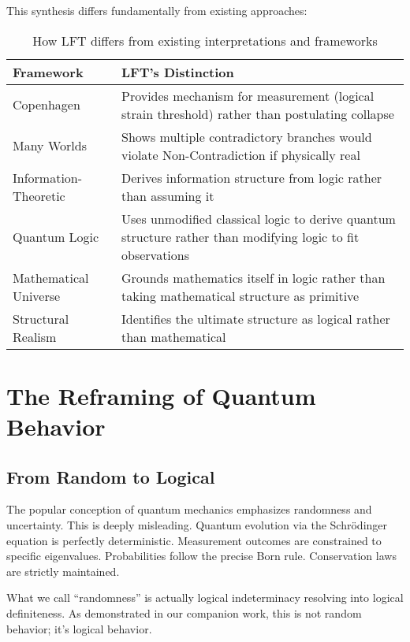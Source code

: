 \documentclass[12pt,a4paper]{article}
\begin{document}
This synthesis differs fundamentally from existing approaches:

\begin{table}[h]
\centering
\begin{tabular}{|p{3cm}|p{9cm}|}
\hline
\textbf{Framework} & \textbf{LFT's Distinction} \\
\hline
Copenhagen & Provides mechanism for measurement (logical strain threshold) rather than postulating collapse \citep{zurek2003decoherence} \\
\hline
Many Worlds & Shows multiple contradictory branches would violate Non-Contradiction if physically real \citep{everett1957relative} \\
\hline
Information-Theoretic & Derives information structure from logic rather than assuming it \citep{brukner2014quantum} \\
\hline
Quantum Logic & Uses unmodified classical logic to derive quantum structure rather than modifying logic to fit observations \citep{isham1995lectures} \\
\hline
Mathematical Universe & Grounds mathematics itself in logic rather than taking mathematical structure as primitive \citep{tegmark2008mathematical} \\
\hline
Structural Realism & Identifies the ultimate structure as logical rather than mathematical \citep{ladyman2007every, french2006structure} \\
\hline
\end{tabular}
\caption{How LFT differs from existing interpretations and frameworks}
\end{table}

\section{The Reframing of Quantum Behavior}

\subsection{From Random to Logical}

The popular conception of quantum mechanics emphasizes randomness and uncertainty. This is deeply misleading. Quantum evolution via the Schrödinger equation is perfectly deterministic. Measurement outcomes are constrained to specific eigenvalues. Probabilities follow the precise Born rule. Conservation laws are strictly maintained.

What we call ``randomness'' is actually logical indeterminacy resolving into logical definiteness. As demonstrated in our companion work, this is not random behavior; it's logical behavior.
\end{document}
